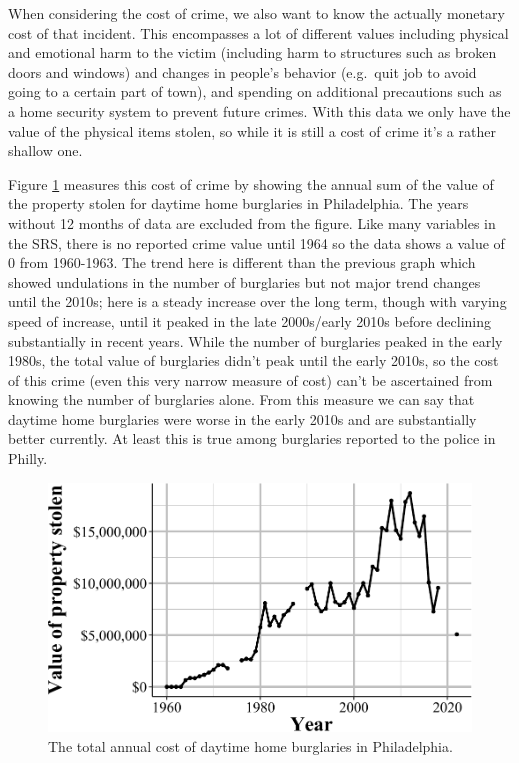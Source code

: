 \documentclass[
  12pt,
  openany]{book}
\begin{document}
When considering the cost of crime, we also want to know the actually monetary cost of that incident. This encompasses a lot of different values including physical and emotional harm to the victim (including harm to structures such as broken doors and windows) and changes in people's behavior (e.g.~quit job to avoid going to a certain part of town), and spending on additional precautions such as a home security system to prevent future crimes. With this data we only have the value of the physical items stolen, so while it is still a cost of crime it's a rather shallow one.

Figure \ref{fig:PhillyBurglaryCost} measures this cost of crime by showing the annual sum of the value of the property stolen for daytime home burglaries in Philadelphia. The years without 12 months of data are excluded from the figure. Like many variables in the SRS, there is no reported crime value until 1964 so the data shows a value of 0 from 1960-1963. The trend here is different than the previous graph which showed undulations in the number of burglaries but not major trend changes until the 2010s; here is a steady increase over the long term, though with varying speed of increase, until it peaked in the late 2000s/early 2010s before declining substantially in recent years. While the number of burglaries peaked in the early 1980s, the total value of burglaries didn't peak until the early 2010s, so the cost of this crime (even this very narrow measure of cost) can't be ascertained from knowing the number of burglaries alone. From this measure we can say that daytime home burglaries were worse in the early 2010s and are substantially better currently. At least this is true among burglaries reported to the police in Philly.

\begin{figure}

{\centering \includegraphics[width=0.9\linewidth]{04_stolen_property_files/figure-latex/PhillyBurglaryCost-1} 

}

\caption{The total annual cost of daytime home burglaries in Philadelphia.}\label{fig:PhillyBurglaryCost}
\end{figure}
\end{document}
